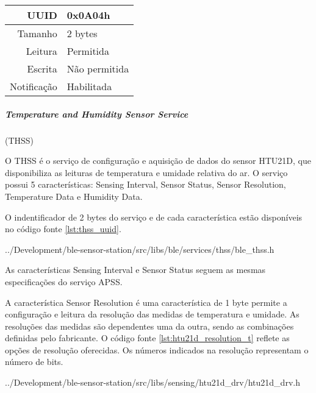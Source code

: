 \begin{tcolorbox}[arc=3mm,fontupper=\small,fonttitle=\bfseries,
subtitle style={boxrule=0.4pt, colback=white},colframe=green!25!black,
halign=center,bottom=0mm,
title=Air Pressure Sensor Service]
\begin{tcbitemize}[raster columns=2,raster equal height,fontupper=\footnotesize,
	colbacktitle=yellow!100!red!100!black, coltitle=black,
	fonttitle=\footnotesize\bfseries,size=small, halign=center]
		\tcbitem [squeezed title={Temperature Data Characteristic}]
		\begin{tabular}{ r | l }
		UUID & 0x0A04h \\ \hline
		Tamanho & 2 bytes \\ \hline
		Leitura & Permitida \\ \hline
		Escrita & Não permitida \\ \hline
		Notificação & Habilitada 
		\end{tabular}		
	\end{tcbitemize}
	\tcblower
	\label{fig:resumo_apss}
\end{tcolorbox}

\newpage
\subparagraph{Temperature and Humidity Sensor Service}(THSS) 
\newline

O THSS é o serviço de configuração e aquisição de dados do sensor HTU21D, que
disponibiliza as leituras de temperatura e umidade relativa do ar. O serviço
possui 5 características: Sensing Interval, Sensor Status, Sensor Resolution,
Temperature Data e Humidity Data.

O indentificador de 2 bytes do serviço e de cada característica estão
disponíveis no código fonte \ref{lst:thss_uuid}.

\begin{minipage}{0.95\linewidth}

{../Development/ble-sensor-station/src/libs/ble/services/thss/ble_thss.h}
\end{minipage}

As características Sensing Interval e Sensor Status seguem as mesmas
especificações do serviço APSS.

A característica Sensor Resolution é uma característica de 1 byte permite a
configuração e leitura da resolução das medidas de temperatura e umidade. As
resoluções das medidas são dependentes uma da outra, sendo as combinações
definidas pelo fabricante. O código fonte \ref{lst:htu21d_resolution_t} reflete
as opções de resolução oferecidas. Os números indicados na resolução
representam o número de bits.

\begin{minipage}{0.95\linewidth}

{../Development/ble-sensor-station/src/libs/sensing/htu21d_drv/htu21d_drv.h}
\end{minipage}

